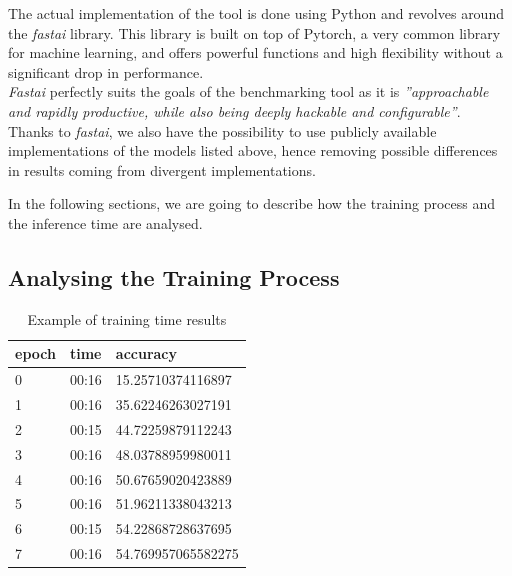 The actual implementation of the tool is done using Python and revolves around the \textit{fastai} library. This library is built on top of Pytorch, a very common library for machine learning, and offers powerful functions and high flexibility without a significant drop in performance. \cite{fastai}\\
\textit{Fastai} perfectly suits the goals of the benchmarking tool as it is \textit{''approachable and rapidly productive, while also being deeply hackable and configurable''}. \cite{fastai}\\
Thanks to \textit{fastai}, we also have the possibility to use publicly available implementations of the models listed above, hence removing possible differences in results coming from divergent implementations. 

In the following sections, we are going to describe how the training process and the inference time are analysed. 

\subsection{Analysing the Training Process}\label{sec:training_process_bench}

\begin{table}[h]
\centering
\begin{tabular}{ p{2cm} p{2cm} p{3.5cm}   }
 epoch&time&accuracy\\
 \hline
0&00:16&15.25710374116897\\
1&00:16&35.62246263027191\\
2&00:15&44.72259879112243\\
3&00:16&48.03788959980011\\
4&00:16&50.67659020423889\\
5&00:16&51.96211338043213\\
6&00:15&54.22868728637695\\
7&00:16&54.769957065582275\\
 \hline
\end{tabular}
\caption[Example of training time results]{Example of training time results}
\label{tab:m_fast_time}
\end{table}

